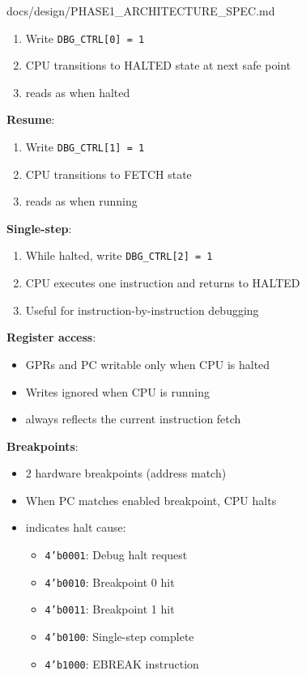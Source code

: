 \begin{relocated}{docs/design/PHASE1_ARCHITECTURE_SPEC.md}
\begin{enumerate}
\def\labelenumi{\arabic{enumi}.}
\tightlist
\item
  Write \texttt{DBG\_\allowbreak{}CTRL[0]\ =\allowbreak{}\ 1}
\item
  CPU transitions to HALTED state at next safe point
\item
   reads as  when halted
\end{enumerate}

\textbf{Resume}:

\begin{enumerate}
\def\labelenumi{\arabic{enumi}.}
\tightlist
\item
  Write \texttt{DBG\_\allowbreak{}CTRL[1]\ =\allowbreak{}\ 1}
\item
  CPU transitions to FETCH state
\item
   reads as  when running
\end{enumerate}

\textbf{Single-step}:

\begin{enumerate}
\def\labelenumi{\arabic{enumi}.}
\tightlist
\item
  While halted, write
  \texttt{DBG\_\allowbreak{}CTRL[2]\ =\allowbreak{}\ 1}
\item
  CPU executes one instruction and returns to HALTED
\item
  Useful for instruction-by-instruction debugging
\end{enumerate}

\textbf{Register access}:

\begin{itemize}
\tightlist
\item
  GPRs and PC writable only when CPU is halted
\item
  Writes ignored when CPU is running
\item
   always reflects the current instruction fetch
\end{itemize}

\textbf{Breakpoints}:

\begin{itemize}
\tightlist
\item
  2 hardware breakpoints (address match)
\item
  When PC matches enabled breakpoint, CPU halts
\item
   indicates halt cause:

  \begin{itemize}
  \tightlist
  \item
    \texttt{4'b0001}: Debug halt request
  \item
    \texttt{4'b0010}: Breakpoint 0 hit
  \item
    \texttt{4'b0011}: Breakpoint 1 hit
  \item
    \texttt{4'b0100}: Single-step complete
  \item
    \texttt{4'b1000}: EBREAK instruction
  \end{itemize}
\end{itemize}


\end{relocated}
